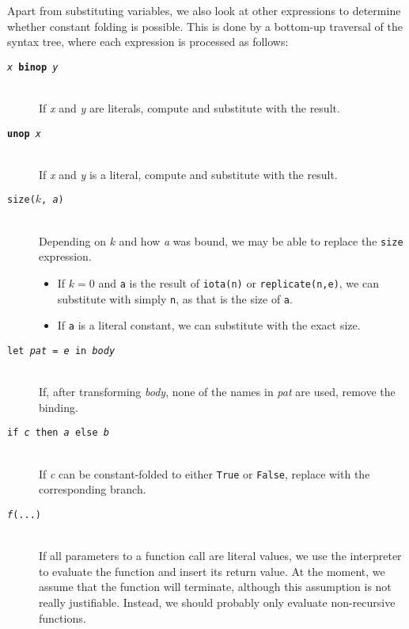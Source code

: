 Apart from substituting variables, we also look at other expressions
to determine whether constant folding is possible. This is done by a
bottom-up traversal of the syntax tree, where each expression is
processed as follows:

\begin{description}
\item[\texttt{\textit{x} \textbf{binop} \textit{y}}] \hfill\\
  If \textit{x} and \textit{y} are literals, compute and substitute
  with the result.

  \item[\texttt{\textbf{unop} \textit{x}}]\hfill\\
    If \textit{x} and \textit{y} is a literal, compute and substitute
  with the result.

  \item[\texttt{size($k$, \textit{a})}]\hfill\\
    Depending on $k$ and how \textit{a} was bound, we may be able to
    replace the \texttt{size} expression.
    \begin{itemize}
    \item If $k=0$ and \texttt{a} is the result of \texttt{iota(n)} or
      \texttt{replicate(n,e)}, we can substitute with simply
      \texttt{n}, as that is the size of \texttt{a}.
    \item If \texttt{a} is a literal constant, we can substitute
      with the exact size.
    \end{itemize}

  \item[\texttt{let \textit{pat} = \textit{e} in \textit{body}}]\hfill\\
    If, after transforming \textit{body}, none of the names in
    \textit{pat} are used, remove the binding.

  \item[\texttt{if \textit{c} then \textit{a} else \textit{b}}]\hfill\\
    If \textit{c} can be constant-folded to either \texttt{True} or
    \texttt{False}, replace with the corresponding branch.

  \item[\texttt{\textit{f}(...)}]\hfill\\
    If all parameters to a function call are literal values, we use
    the interpreter to evaluate the function and insert its return
    value.  At the moment, we assume that the function will terminate,
    although this assumption is not really justifiable.  Instead, we
    should probably only evaluate non-recursive functions.


\end{description}
